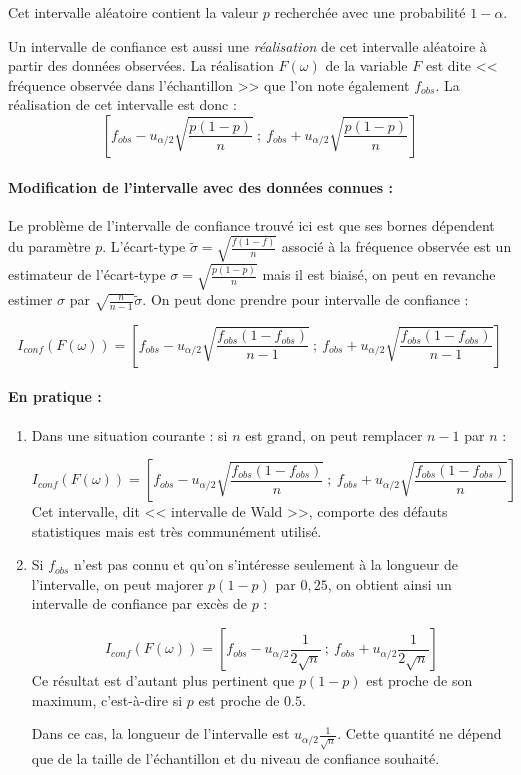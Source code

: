Cet intervalle aléatoire contient la valeur $p$ recherchée avec une probabilité $1-\alpha$. 

Un intervalle de confiance est aussi une \textit{réalisation} de cet intervalle aléatoire à partir des données observées. La réalisation $F(\omega)$ de la variable $F$ est dite << fréquence observée dans l'échantillon >> que l'on note également $f_{obs}$. La réalisation de cet intervalle est donc :
$$\left[f_{obs}-u_{\alpha/2} {\sqrt{\frac{p(1-p)}{n}}} ~;~ f_{obs} + u_{\alpha/2}{\sqrt{\frac{p(1-p)}{n}}} \right]$$

\paragraph{Modification de l'intervalle avec des données connues :}

Le problème de l'intervalle de confiance trouvé ici est que ses bornes dépendent du paramètre  $p$. L'écart-type $\tilde{\sigma}=\sqrt{\frac{f(1-f)}{n}}$ associé à la fréquence observée est un estimateur de l'écart-type $\sigma=\sqrt{\frac{p(1-p)}{n}}$ mais il est biaisé, on peut en revanche estimer $\sigma$ par $\sqrt{\frac{n}{n-1}}\tilde{\sigma}$. On peut donc prendre pour intervalle de confiance :

$$I_{conf}(F(\omega))=\left[f_{obs}-u_{\alpha/2} \sqrt{\frac{f_{obs}(1-f_{obs})}{n-1}} ~;~ f_{obs} + u_{\alpha/2} \sqrt{\frac{f_{obs}(1-f_{obs})}{n-1}} \right]$$

\paragraph{En pratique :} 
\begin{enumerate}
	\item Dans une situation courante : si $n$ est grand, on peut remplacer $n-1$ par $n$ :
	
	$$I_{conf}(F(\omega))=\left[f_{obs}-u_{\alpha/2} \sqrt{\frac{f_{obs}(1-f_{obs})}{n}} ~;~ f_{obs} + u_{\alpha/2} \sqrt{\frac{f_{obs}(1-f_{obs})}{n}} \right]$$
	Cet intervalle, dit << intervalle de Wald >>, comporte des défauts statistiques mais est très communément utilisé.
	\item  Si $f_{obs}$ n'est pas connu et qu'on s'intéresse seulement à la longueur de l'intervalle, on peut majorer $p(1-p)$ par $0{,}25$, on obtient ainsi un intervalle de confiance par excès de $p$ :
	
	$$I_{conf}(F(\omega))=\left[ f_{obs}-u_{\alpha/2} \frac{1}{2 \sqrt{n}} ~;~ f_{obs} + u_{\alpha/2} \frac{1}{2 \sqrt{n}} \right]$$
	Ce résultat est d'autant plus pertinent que $p(1-p)$ est proche de son maximum, c'est-à-dire si $p$ est proche de $0.5$.
	
	Dans ce cas, la longueur de l'intervalle est $u_{\alpha/2} \frac{1}{\sqrt{n}}$. Cette quantité ne dépend que de la taille de l'échantillon et du niveau de confiance souhaité. 
	
\end{enumerate}



